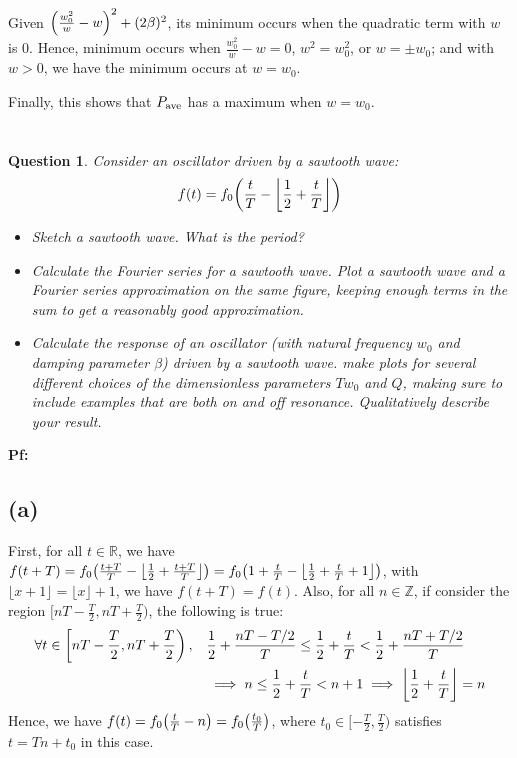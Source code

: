 \documentclass{article}
\newtheorem{question}{Question}
\newcommand{\ZZ}{\mathbb{Z}}
\newcommand{\RR}{\mathbb{R}}
\DeclarePairedDelimiter{\paran}{(}{)}%
\DeclarePairedDelimiter{\floor}{\lfloor}{\rfloor}
\begin{document}
Given $\paran*{\frac{w_0^2}{w}-w}^2+(2\beta)^2$, its minimum occurs when the quadratic term with $w$ is $0$. Hence, minimum occurs when $\frac{w_0^2}{w}-w=0$, $w^2=w_0^2$, or $w=\pm w_0$; and with $w>0$, we have the minimum occurs at $w=w_0$.

Finally, this shows that $P_\textmd{ave}$ has a maximum when $w=w_0$.

\break


\section{}
\begin{question}\label{q4}
    Consider an oscillator driven by a sawtooth wave:
    $$f(t)=f_0\paran*{\frac{t}{T}-\left\lfloor\frac{1}{2}+\frac{t}{T}\right\rfloor}$$
    \begin{itemize}
        \item[(a)] Sketch a sawtooth wave. What is the period?
        \item[(b)] Calculate the Fourier series for a sawtooth wave. Plot a sawtooth wave and a Fourier series approximation on the same figure, keeping enough terms in the sum to get a reasonably good approximation.
        \item[(c)] Calculate the response of an oscillator (with natural frequency $w_0$ and damping parameter $\beta$) driven by a sawtooth wave. make plots for several different choices of the dimensionless parameters $Tw_0$ and $Q$, making sure to include examples that are both on and off resonance. Qualitatively describe your result.
    \end{itemize}
\end{question}

\textbf{Pf:}
\subsection*{(a)}
First, for all $t \in \RR$, we have $f(t+T) = f_0\paran*{\frac{t+T}{T}-\left\lfloor\frac{1}{2}+\frac{t+T}{T}\right\rfloor}=f_0\paran*{1+\frac{t}{T}-\left\lfloor\frac{1}{2}+\frac{t}{T}+1\right\rfloor}$, with $\lfloor x+1\rfloor = \lfloor x\rfloor +1$, we have $f(t+T)=f(t)$.
Also, for all $n \in \ZZ$, if consider the region $[nT-\frac{T}{2},nT+\frac{T}{2})$, the following is true:
\begin{align}
    \forall t \in \left[nT-\frac{T}{2},nT+\frac{T}{2}\right),\quad &\frac{1}{2}+\frac{nT-T/2}{T}\leq \frac{1}{2}+\frac{t}{T}<\frac{1}{2}+\frac{nT+T/2}{T}\\
    &\implies n\leq \frac{1}{2}+\frac{t}{T}<n+1\implies \floor*{\frac{1}{2}+\frac{t}{T}}=n
\end{align}
Hence, we have $f(t) = f_0\paran*{\frac{t}{T}-n} = f_0\paran*{\frac{t_0}{T}}$, where $t_0\in [-\frac{T}{2},\frac{T}{2})$ satisfies $t = Tn+t_0$ in this case.
\end{document}
